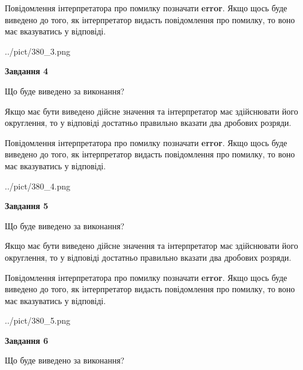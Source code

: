 \documentclass[12pt, ukrainian]{article}
\begin{document}
{\begin {Large}
Повідомлення інтерпретатора про помилку позначати \textbf{error}.
Якщо щось буде виведено до того, як інтерпретатор видасть повідомлення про помилку, 
то воно має вказуватись у відповіді. \par

\begin{center}
	{../pict/380_3.png}
\end{center}
\newpage

{\begin {center}\textbf{Завдання 4}\end {center}}\par
Що буде виведено за виконання? \par

Якщо має бути виведено дійсне значення та інтерпретатор має здійснювати його округлення, 
то у відповіді достатньо правильно вказати два дробових розряди.

Повідомлення інтерпретатора про помилку позначати \textbf{error}.
Якщо щось буде виведено до того, як інтерпретатор видасть повідомлення про помилку, 
то воно має вказуватись у відповіді. \par

\begin{center}
	{../pict/380_4.png}
\end{center}
\newpage

{\begin {center}\textbf{Завдання 5}\end {center}}\par
Що буде виведено за виконання? \par

Якщо має бути виведено дійсне значення та інтерпретатор має здійснювати його округлення, 
то у відповіді достатньо правильно вказати два дробових розряди.

Повідомлення інтерпретатора про помилку позначати \textbf{error}.
Якщо щось буде виведено до того, як інтерпретатор видасть повідомлення про помилку, 
то воно має вказуватись у відповіді. \par

\begin{center}
	{../pict/380_5.png}
\end{center}
\newpage

{\begin {center}\textbf{Завдання 6}\end {center}}\par
Що буде виведено за виконання? \par


\end{Large}}
\end{document}
